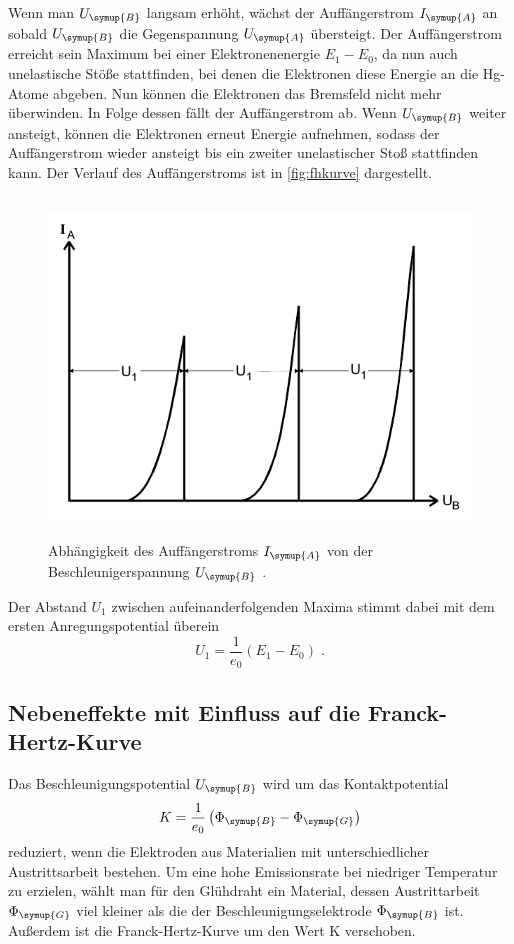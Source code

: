 Wenn man $U_{\symup{B}}$ langsam erhöht, wächst der Auffängerstrom $I_{\symup{A}}$ an sobald $U_{\symup{B}}$ die Gegenspannung $U_{\symup{A}}$ 
übersteigt. Der Auffängerstrom erreicht sein Maximum bei einer Elektronenenergie $E_1 - E_0$, da nun auch unelastische Stöße stattfinden, bei denen
die Elektronen diese Energie an die Hg-Atome abgeben. Nun können die Elektronen das Bremsfeld nicht mehr überwinden. In Folge dessen fällt der 
Auffängerstrom ab. Wenn $U_{\symup{B}}$ weiter ansteigt, können die Elektronen erneut Energie aufnehmen, sodass der Auffängerstrom wieder ansteigt 
bis ein zweiter unelastischer Stoß stattfinden kann. Der Verlauf des Auffängerstroms ist in \autoref{fig:fhkurve} dargestellt. 
\begin{figure}
    \centering
    \includegraphics[height = 9cm]{fhkurve.pdf}
    \caption{Abhängigkeit des Auffängerstroms $I_{\symup{A}}$ von der Beschleunigerspannung $U_{\symup{B}}$ \cite{ap601}.}
    \label{fig:fhkurve}
\end{figure}

Der Abstand $U_1$ zwischen aufeinanderfolgenden Maxima stimmt dabei mit dem ersten Anregungspotential überein
\begin{equation}
    U_1 = \frac{1}{e_0}\left(E_1 - E_0\right) \; .
    \label{eqn:U1}
\end{equation}

\subsection{Nebeneffekte mit Einfluss auf die Franck-Hertz-Kurve}
Das Beschleunigungspotential $U_{\symup{B}}$ wird um das Kontaktpotential 
\begin{equation*}
    K = \frac{1}{e_0} \left(\Phi_{\symup{B}}-\Phi_{\symup{G}}\right)
\end{equation*}
reduziert, wenn die Elektroden aus Materialien mit unterschiedlicher Austrittsarbeit bestehen. Um eine hohe Emissionsrate bei niedriger Temperatur zu 
erzielen, wählt man für den Glühdraht ein Material, dessen Austrittarbeit $\Phi_{\symup{G}}$ viel kleiner als die der Beschleunigungselektrode 
$\Phi_{\symup{B}}$ ist.
Außerdem ist die Franck-Hertz-Kurve um den Wert K verschoben.

